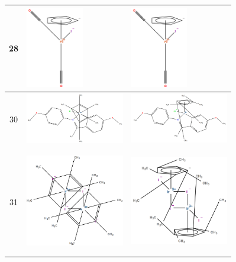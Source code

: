 \begin{longtable}{c>{\centering}m{5cm}>{\centering\arraybackslash}m{5.9cm}}
 28 &
 \includegraphics[width=2.5cm]{imagenes/resultados/moleculas/iron(II).png} & 
 \includegraphics[width=2.5cm]{imagenes/resultados/moleculas/iron(II).png} \\
\midrule

 30 &
 \includegraphics[width=4.3cm]{imagenes/resultados/cps/mol30_original.png} & 
 \includegraphics[width=4.3cm]{imagenes/resultados/cps/mol30_cp.png} \\
\midrule

 31 &
 \includegraphics[width=4.3cm]{imagenes/resultados/cps/mol31_original.png} & 
 \includegraphics[width=4.3cm]{imagenes/resultados/cps/mol31_cp.png} 

\label{tab:cps_dibujado}
\end{longtable}




